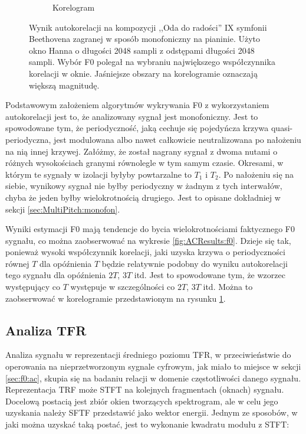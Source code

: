 \documentclass[12pt,a4paper,twoside]{mwart}
\begin{document}
\begin{figure}[t]
\begin{subfigure}{1\textwidth}
    \caption{Korelogram}
    \label{fig:ACResults:corr}
  \end{subfigure}
  \caption{Wynik autokorelacji na kompozycji ,,Oda do radości'' IX symfonii Beethovena zagranej w sposób monofoniczny na pianinie. Użyto okno Hanna o długości 2048 sampli z odstępami długości 2048 sampli. Wybór F0 polegał na wybraniu największego współczynnika korelacji w oknie. Jaśniejsze obszary na korelogramie oznaczają większą magnitudę.}
  \label{fig:ACResults}
\end{figure}

Podstawowym założeniem algorytmów wykrywania F0 z wykorzystaniem autokorelacji jest to, że analizowany sygnał jest monofoniczny. Jest to spowodowane tym, że periodyczność, jaką cechuje się pojedyńcza krzywa quasi-periodyczna, jest modulowana albo nawet całkowicie neutralizowana po nałożeniu na nią innej krzywej. Załóżmy, że został nagrany sygnał z dwoma nutami o różnych wysokościach granymi równolegle w tym samym czasie. Okresami, w którym te sygnały w izolacji byłyby powtarzalne to $T_1$ i $T_2$. Po nałożeniu się na siebie, wynikowy sygnał nie byłby periodyczny w żadnym z tych interwałów, chyba że jeden byłby wielokrotnością drugiego. Jest to opisane dokładniej w sekcji \ref{sec:MultiPitch:monofon}.

Wyniki estymacji F0 mają tendencje do bycia wielokrotnościami faktycznego F0 sygnału, co można zaobserwować na wykresie \ref{fig:ACResults:f0}. Dzieje się tak, ponieważ wysoki współczynnik korelacji, jaki uzyska krzywa o periodyczności równej $T$ dla opóźnienia $T$ będzie relatywnie podobny do wyniku autokorelacji tego sygnału dla opóźnienia $2T$, $3T$ itd. Jest to spowodowane tym, że wzorzec występujący co $T$ występuje w szczególności co $2T$, $3T$ itd. \cite[231-244]{Transcription:Anssi:SignalProcessingMethods}
Można to zaobserwować w korelogramie przedstawionym na rysunku \ref{fig:ACResults:corr}.

\subsection{Analiza TFR} \label{sec:f0:tfr}
Analiza sygnału w reprezentacji średniego poziomu TFR, w przeciwieństwie do operowania na nieprzetworzonym sygnale cyfrowym, jak miało to miejsce w sekcji \ref{sec:f0:ac}, skupia się na badaniu relacji w domenie częstotliwości danego sygnału. Reprezentacja TRF może STFT na kolejnych fragmentach (oknach) sygnału. Docelową postacią jest zbiór okien tworzących spektrogram, ale w celu jego uzyskania należy SFTF przedstawić jako wektor energii. Jednym ze sposobów, w jaki można uzyskać taką postać, jest to wykonanie kwadratu modułu z STFT:
\end{document}
